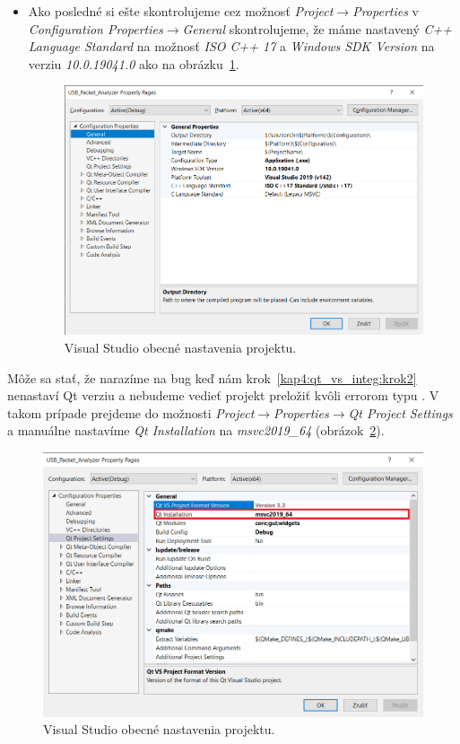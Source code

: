 \begin{itemize}
\begin{itemize}
\item Ako posledné si ešte skontrolujeme cez možnosť \textit{Project}$\rightarrow$\textit{Properties} v \textit{Configuration Properties}$\rightarrow$\textit{General} skontrolujeme, že máme nastavený \textit{C++ Language Standard} na možnosť \textit{ISO C++ 17} a \textit{Windows SDK Version} na verziu \textit{10.0.19041.0} ako na obrázku~\ref{obr:kap4:vs_prop}.

\begin{figure}[!htb]
	\centering
	\includegraphics[width=12cm]{img/kap04_vs_prop}
	\caption{Visual Studio obecné nastavenia projektu.}
	\label{obr:kap4:vs_prop}
\end{figure}

\end{itemize}
Môže sa stať, že narazíme na bug keď nám krok~\ref{kap4:qt_vs_integ:krok2} nenastaví Qt verziu a nebudeme vedieť projekt preložiť kvôli errorom typu . V takom prípade prejdeme do možnosti \textit{Project}$\rightarrow$\textit{Properties}$\rightarrow$\textit{Qt Project Settings} a manuálne nastavíme \textit{Qt Installation} na \textit{msvc2019\_64} (obrázok~\ref{obr:kap4:vs_manual}).

\begin{figure}[!htb]
	\centering
	\includegraphics[width=12cm]{img/kap04_vs_manual}
	\caption{Visual Studio obecné nastavenia projektu.}
	\label{obr:kap4:vs_manual}
\end{figure}


\end{itemize}
